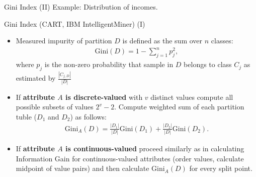 \begin{frame}{Gini Index (II)} %
	\centering
	Example: Distribution of incomes.\\[0.5cm]
\end{frame}

\begin{frame}{Gini Index (CART, IBM IntelligentMiner) (I)}
	\begin{itemize}
		\item Measured impurity of partition $D$ is defined as the sum over $n$ classes:
		      \begin{align*}
			      \text{Gini}(D) = 1-\sum_{j=1}^{n} p_j^2,
		      \end{align*}
		      where $p_j$ is the non-zero probability that sample in $D$ belongs to class $C_j$ as estimated by $\frac{|C_{j,D}|}{|D|}$
		\item If \textbf{attribute $A$ is discrete-valued} with $v$ distinct values
		      compute all possible subsets of values $2^v - 2$. Compute weighted sum of
		      each partition tuble ($D_1$ and $D_2$) as follows:
		      \begin{align*}
			      \text{Gini}_A(D) = \frac{|D_1|}{|D|}\text{Gini}(D_1)+\frac{|D_2|}{|D|}\text{Gini}(D_2).
		      \end{align*}
		\item If \textbf{attribute $A$ is continuous-valued} proceed similarly as in
		      calculating Information Gain for continuous-valued attributes (order values,
		      calculate midpoint of value pairs) and then calculate $\text{Gini}_A(D)$ for
		      every split point.
	\end{itemize}
\end{frame}

